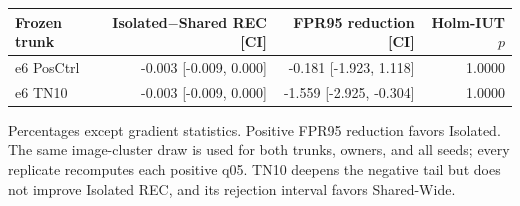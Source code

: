 \begin{table}[t]
\begin{tabular}{llrrrr}
\bottomrule
\end{tabular}
\par\smallskip
\begin{tabular}{lrrr}
\toprule
Frozen trunk & Isolated$-$Shared REC [CI] & FPR95 reduction [CI] & Holm-IUT $p$\\
\midrule
e6 PosCtrl & -0.003 [-0.009, 0.000] & -0.181 [-1.923, 1.118] & 1.0000 \\
e6 TN10 & -0.003 [-0.009, 0.000] & -1.559 [-2.925, -0.304] & 1.0000 \\
\bottomrule
\end{tabular}
\parbox{0.98\textwidth}{\scriptsize Percentages except gradient statistics.
Positive FPR95 reduction favors Isolated.  The same image-cluster draw is used
for both trunks, owners, and all seeds; every replicate recomputes each
positive q05.  TN10 deepens the negative tail but does not improve Isolated
REC, and its rejection interval favors Shared-Wide.}
\end{table}

